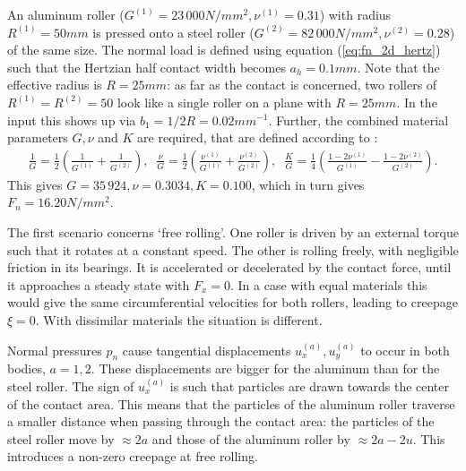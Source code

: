 \documentclass[12pt]{report}
\begin{document}
An aluminum roller ($G^{(1)}=23\,000\unit{N/mm^2}, \nu^{(1)}=0.31$) with radius
$R^{(1)}=50\unit{mm}$ is pressed onto a steel roller
($G^{(2)}=82\,000\unit{N/mm^2},
\nu^{(2)}=0.28$) of the same size. The normal load is defined
using equation (\ref{eq:fn_2d_hertz}) such that the Hertzian half contact
width becomes $a_h=0.1\unit{mm}$. Note that the effective radius is
$R=25\unit{mm}$:
as far as the contact is concerned, two rollers of $R^{(1)}=R^{(2)}=50$
look like a single roller on a plane with $R=25\unit{mm}$. In the input this
shows up via $b_1=1/2R=0.02\unit{mm^{-1}}$. Further, the combined
material parameters $G, \nu$ and $K$ are required, that are defined
according to \cite[eq.(1.44)]{Kalker1990}:
\begin{eqnarray}
  \frac{1}{G}=\frac{1}{2}\left( \frac{1}{G^{(1)}} + 
                     \frac{1}{G^{(2)}} \right), \label{eq:g_comb} \;\;
  \frac{\nu}{G}=\frac{1}{2}\left( \frac{\nu^{(1)}}{G^{(1)}} + 
                     \frac{\nu^{(2)}}{G^{(2)}} \right), \label{eq:nu_comb} \;\;
  \frac{K}{G} = \frac{1}{4}\left( \frac{1-2\nu^{(1)}}{G^{(1)}} -
                     \frac{1-2\nu^{(2)}}{G^{(2)}} \right) . \label{eq:k_comb}
\end{eqnarray}
This gives $G=35\,924, \nu=0.3034, K=0.100$, which in turn gives
$F_n=16.20\unit{N/mm^2}$.

The first scenario concerns `free rolling'. One roller is driven by an
external torque such that it rotates at a constant speed. The other is
rolling freely, with negligible friction in its bearings. It is accelerated
or decelerated by the contact force, until it approaches a steady state
with $F_x=0$. In a case with equal materials this would give the same
circumferential velocities for both rollers, leading to creepage $\xi=0$.
With dissimilar materials the situation is different.

Normal pressures $p_n$ cause tangential displacements $u^{(a)}_x, u^{(a)}_y$
to occur in both bodies, $a=1,2$. These displacements are bigger for the
aluminum than for the steel roller. The sign of $u^{(a)}_x$ is such that
particles are drawn towards the center of the contact area. This means that
the particles of the aluminum roller traverse a smaller distance when
passing through the contact area: the particles of the steel roller move by
$\approx 2 a$ and those of the aluminum roller by $\approx 2 a-2u$.
This introduces a non-zero creepage at free rolling.
\end{document}
